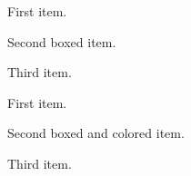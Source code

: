 \documentclass{article}
\begin{document}
\begin{enumerate}
	\item First item.
	{
		\renewcommand\labelenumi{\fbox{\theenumi}}
		\item Second boxed item.
	}
	\item Third item.
\end{enumerate}

\begin{enumerate}
	\item First item.
	{
		\renewcommand\labelenumi{\colorbox{red}{\theenumi}}
		\item Second boxed and colored item.
	}
	\item Third item.
\end{enumerate}
\end{document}
